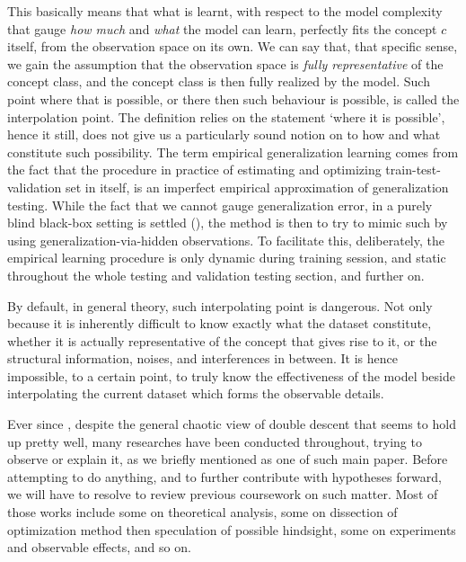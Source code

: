 \documentclass[10pt]{article} %
\begin{document}
This basically means that what is learnt, with respect to the model complexity that gauge \textit{how much} and \textit{what} the model can learn, perfectly fits the concept $c$ itself, from the observation space on its own. We can say that, that specific sense, we gain the assumption that the observation space is \textit{fully representative} of the concept class, and the concept class is then fully realized by the model. Such point where that is possible, or there then such behaviour is possible, is called the interpolation point. The definition relies on the statement `where it is possible', hence it still, does not give us a particularly sound notion on to how and what constitute such possibility. The term empirical generalization learning comes from the fact that the procedure in practice of estimating and optimizing train-test-validation set in itself, is an imperfect empirical approximation of generalization testing. While the fact that we cannot gauge generalization error, in a purely blind black-box setting is settled (\cite{10.5555/2371238,10.5555/2930837,10.5555/2621980}), the method is then to try to mimic such by using generalization-via-hidden observations. To facilitate this, deliberately, the empirical learning procedure is only dynamic during training session, and static throughout the whole testing and validation testing section, and further on. 

By default, in general theory, such interpolating point is dangerous. Not only because it is inherently difficult to know exactly what the dataset constitute, whether it is actually representative of the concept that gives rise to it, or the structural information, noises, and interferences in between. It is hence impossible, to a certain point, to truly know the effectiveness of the model beside interpolating the current dataset which forms the observable details.

Ever since \cite{belkin_reconciling_2019}, despite the general chaotic view of double descent that seems to hold up pretty well, many researches have been conducted throughout, trying to observe or explain it, as we briefly mentioned \cite{nakkiran_deep_2019} as one of such main paper. Before attempting to do anything, and to further contribute with hypotheses forward, we will have to resolve to review previous coursework on such matter. Most of those works include some on theoretical analysis, some on dissection of optimization method then speculation of possible hindsight, some on experiments and observable effects, and so on. 
\end{document}
